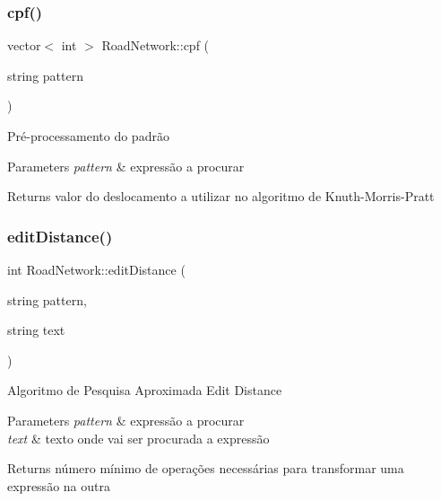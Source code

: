 \subsubsection{\texorpdfstring{cpf()}{cpf()}}
{\footnotesize\ttfamily vector$<$ int $>$ Road\+Network\+::cpf (\begin{DoxyParamCaption}\item[{string}]{pattern }\end{DoxyParamCaption})}

Pré-\/processamento do padrão 
\begin{DoxyParams}{Parameters}
{\em pattern} & expressão a procurar \\
\hline
\end{DoxyParams}
\begin{DoxyReturn}{Returns}
valor do deslocamento a utilizar no algoritmo de Knuth-\/\+Morris-\/\+Pratt 
\end{DoxyReturn}
\mbox{\label{class_road_network_ab0b036ff84a1e057d28d42bfeaae27dd}} 
\subsubsection{\texorpdfstring{edit\+Distance()}{editDistance()}}
{\footnotesize\ttfamily int Road\+Network\+::edit\+Distance (\begin{DoxyParamCaption}\item[{string}]{pattern,  }\item[{string}]{text }\end{DoxyParamCaption})}

Algoritmo de Pesquisa Aproximada Edit Distance 
\begin{DoxyParams}{Parameters}
{\em pattern} & expressão a procurar \\
\hline
{\em text} & texto onde vai ser procurada a expressão \\
\hline
\end{DoxyParams}
\begin{DoxyReturn}{Returns}
número mínimo de operações necessárias para transformar uma expressão na outra 
\end{DoxyReturn}
\mbox{\label{class_road_network_abeb6a77a05ebd0283b00f439f5d96989}} 
